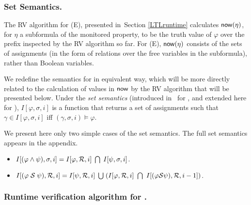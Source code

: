 

\fi

\subsubsection{Set Semantics.}

The RV algorithm for
(E)\PLTL{}, presented in~Section \ref{LTLruntime}
calculates
$\mathsf{now} ( \eta )$, for $\eta$ a
subformula of the monitored property, to be the
truth value of $\varphi$ over the
prefix inspected by the RV algorithm so far. For (E)\PFLTL{},
$\mathsf{now} (\eta )$ consists of the
sets of assignments (in the form of relations
over the free variables in the subformula),
rather than Boolean variables.


We redefine the semantics for \EPFLTL{} in
equivalent way, which will be more directly related to the calculation of values
in $\mathsf{now}$ by the
RV algorithm that will be presented below. 
Under the  {\em set semantics}
(introduced in~\cite{HPU} for \PFLTL{}, and extended here for \EPFLTL{}),
$I [ \varphi , \sigma, i ]$ is a function that returns
a set of assignments such that $\gamma \in I [ \varphi , \sigma, i ]$ 
iff $( \gamma , \sigma , i ) \models \varphi$.

We present here only two simple cases of the set semantics. The full set semantics appears in the appendix. 
\begin{itemize}
\item $I [ ( \varphi \wedge \psi ) , \sigma , i ] = 
I [ \varphi , {\cal R} , i ] \;  \bigcap \; I [ \psi , \sigma , i ]$.
\item $I [ ( \varphi \; \since \; \psi ) , {\cal R} , i ] = 
I [ \psi , {\cal R}, i ] \; \bigcup \;
( I [ \varphi , {\cal R} , i ] \ \bigcap \ 
I [ (\varphi \since \psi ) , {\cal R} , i - 1 ] )$.
\end{itemize}



\subsubsection{Runtime verification algorithm for \PFLTL{}.}

